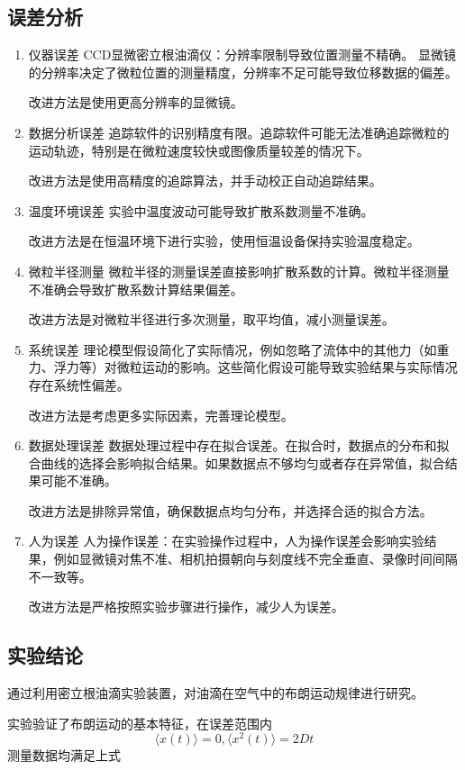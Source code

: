 \documentclass[12pt,a4paper,UTF8]{ctexart}
\begin{document}
\subsection*{误差分析}
\begin{enumerate}
	\item 仪器误差
CCD显微密立根油滴仪：分辨率限制导致位置测量不精确。
显微镜的分辨率决定了微粒位置的测量精度，分辨率不足可能导致位移数据的偏差。

改进方法是使用更高分辨率的显微镜。
	\item 数据分析误差
追踪软件的识别精度有限。追踪软件可能无法准确追踪微粒的运动轨迹，特别是在微粒速度较快或图像质量较差的情况下。

改进方法是使用高精度的追踪算法，并手动校正自动追踪结果。
	\item 温度环境误差
实验中温度波动可能导致扩散系数测量不准确。

改进方法是在恒温环境下进行实验，使用恒温设备保持实验温度稳定。
	\item 微粒半径测量
微粒半径的测量误差直接影响扩散系数的计算。微粒半径测量不准确会导致扩散系数计算结果偏差。

改进方法是对微粒半径进行多次测量，取平均值，减小测量误差。

	\item 系统误差
理论模型假设简化了实际情况，例如忽略了流体中的其他力（如重力、浮力等）对微粒运动的影响。这些简化假设可能导致实验结果与实际情况存在系统性偏差。

改进方法是考虑更多实际因素，完善理论模型。
	
	\item 数据处理误差
数据处理过程中存在拟合误差。在拟合时，数据点的分布和拟合曲线的选择会影响拟合结果。如果数据点不够均匀或者存在异常值，拟合结果可能不准确。

改进方法是排除异常值，确保数据点均匀分布，并选择合适的拟合方法。

	\item 人为误差
人为操作误差：在实验操作过程中，人为操作误差会影响实验结果，例如显微镜对焦不准、相机拍摄朝向与刻度线不完全垂直、录像时间间隔不一致等。

改进方法是严格按照实验步骤进行操作，减少人为误差。
\end{enumerate}
\subsection*{实验结论}
通过利用密立根油滴实验装置，对油滴在空气中的布朗运动规律进行研究。

实验验证了布朗运动的基本特征，在误差范围内
\begin{equation}
    		\langle x(t)\rangle =0 ,
		\langle x^2(t)\rangle =2Dt
	\end{equation}
测量数据均满足上式
\end{document}
